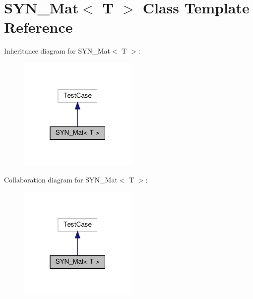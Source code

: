 \hypertarget{classSYN__Mat}{}\section{S\+Y\+N\+\_\+\+Mat$<$ T $>$ Class Template Reference}
\label{classSYN__Mat}


Inheritance diagram for S\+Y\+N\+\_\+\+Mat$<$ T $>$\+:\nopagebreak
\begin{figure}[H]
\begin{center}
\leavevmode
\includegraphics[width=163pt]{classSYN__Mat__inherit__graph}
\end{center}
\end{figure}


Collaboration diagram for S\+Y\+N\+\_\+\+Mat$<$ T $>$\+:\nopagebreak
\begin{figure}[H]
\begin{center}
\leavevmode
\includegraphics[width=163pt]{classSYN__Mat__coll__graph}
\end{center}
\end{figure}
